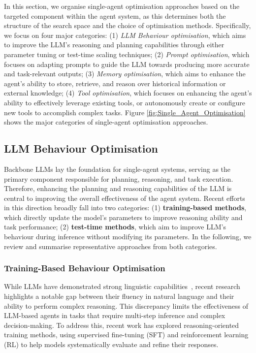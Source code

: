 \documentclass[]{selfevolagent}
\theoremstyle{plain}
\theoremstyle{definition}
\theoremstyle{remark}
\begin{document}
In this section, we organise single-agent optimisation approaches based on the targeted component within the agent system, as this determines both the structure of the search space and the choice of optimisation methods. Specifically, we focus on four major categories: 
(1) \textit{LLM Behaviour optimisation}, which aims to improve the LLM's reasoning and planning capabilities through either parameter tuning or test-time scaling techniques; 
(2) \textit{Prompt optimisation}, which focuses on adapting prompts to guide the LLM towards producing more accurate and task-relevant outputs; 
(3) \textit{Memory optimisation}, which aims to enhance the agent's ability to store, retrieve, and reason over historical information or external knowledge; 
(4) \textit{Tool optimisation}, which focuses on enhancing the agent's ability to effectively leverage existing tools, or autonomously create or configure new tools to accomplish complex tasks. 
Figure \ref{fig:Single_Agent_Optimisation} shows the major categories of single-agent optimisation approaches.



\subsection{LLM Behaviour Optimisation}

Backbone LLMs lay the foundation for single-agent systems, serving as the primary component responsible for planning, reasoning, and task execution. Therefore, enhancing the planning and reasoning capabilities of the LLM is central to improving the overall effectiveness of the agent system. Recent efforts in this direction broadly fall into two categories: (1) \textbf{training-based methods}, which directly update the model's parameters to improve reasoning ability and task performance; (2) \textbf{test-time methods}, which aim to improve LLM's behaviour during inference without modifying its parameters. In the following, we review and summarise representative approaches from both categories. 

\subsubsection{Training-Based Behaviour Optimisation}

While LLMs have demonstrated strong linguistic capabilities~\citep{zhao2023survey}, recent research~\citep{wu-etal-2024-reasoning} highlights a notable gap between their fluency in natural language and their ability to perform complex reasoning. This discrepancy limits the effectiveness of LLM-based agents in tasks that require multi-step inference and complex decision-making. To address this, recent work has explored reasoning-oriented training methods, using supervised fine-tuning (SFT) and reinforcement learning (RL) to help models systematically evaluate and refine their responses.
\end{document}
